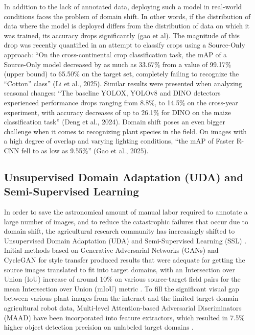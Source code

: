 In addition to the lack of annotated data, deploying such a model in real-world conditions faces the problem of domain shift. In other words, if the distribution of data where the model is deployed differs from the distribution of data on which it was trained, its accuracy drops significantly (gao et al). The magnitude of this drop was recently quantified in an attempt to classify crops using a Source-Only approach: “On the cross-continental crop classification task, the mAP of a Source-Only model decreased by as much as 33.67\% from a value of 99.17\% (upper bound) to 65.50\% on the target set, completely failing to recognize the “Cotton” class” (Li et al., 2025). Similar results were presented when analyzing seasonal changes: “The baseline YOLOX, YOLOv8 and DINO detectors experienced performance drops ranging from 8.8\%, to 14.5\% on the cross-year experiment, with accuracy decreases of up to 26.1\% for DINO on the maize classification task” (Deng et al., 2024). Domain shift poses an even bigger challenge when it comes to recognizing plant species in the field. On images with a high degree of overlap and varying lighting conditions, “the mAP of Faster R-CNN fell to as low as 9.55\%” (Gao et al., 2025).


\subsection{Unsupervised Domain Adaptation (UDA) and Semi-Supervised Learning}
In order to save the astronomical amount of manual labor required to annotate a large number of images, and to reduce the catastrophic failures that occur due to domain shift, the agricultural research community has increasingly shifted to Unsupervised Domain Adaptation (UDA) and Semi-Supervised Learning (SSL) \cite{nadeem2026}. Initial methods based on Generative Adversarial Networks (GANs) and CycleGAN for style transfer produced results that were adequate for getting the source images translated to fit into target domains, with an Intersection over Union (IoU) increase of around 10\% on various source-target field pairs for the mean Intersection over Union (mIoU) metric \cite{ilyas2023} \cite{magistri2023}. To fill the significant visual gap between various plant images from the internet and the limited target domain agricultural robot data, Multi-level Attention-based Adversarial Discriminators (MAAD) have been incorporated into feature extractors, which resulted in 7.5\% higher object detection precision on unlabeled target domains \cite{tzouras2023}.

